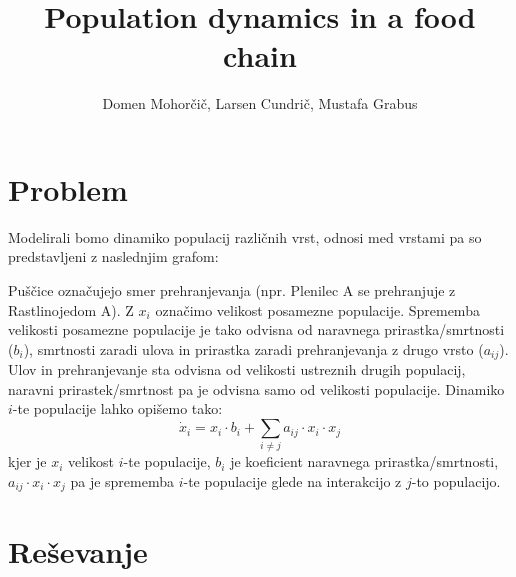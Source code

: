 \documentclass[a4paper, 12pt]{article}
\begin{document}
\title{Population dynamics in a food chain}
\author{Domen Mohorčič, Larsen Cundrič, Mustafa Grabus}
\maketitle

\section{Problem}
Modelirali bomo dinamiko populacij različnih vrst, odnosi med vrstami pa so predstavljeni
z naslednjim grafom: \\
\begin{center}
\end{center}
Puščice označujejo smer prehranjevanja (npr. Plenilec A se prehranjuje z Rastlinojedom A).
Z $ x_{i} $ označimo velikost posamezne populacije. Sprememba velikosti posamezne populacije
je tako odvisna od naravnega prirastka/smrtnosti ($ b_{i} $), smrtnosti zaradi ulova in prirastka zaradi
prehranjevanja z drugo vrsto ($ a_{ij} $). Ulov in prehranjevanje sta odvisna od velikosti ustreznih drugih populacij,
naravni prirastek/smrtnost pa je odvisna samo od velikosti populacije. Dinamiko $ i $-te
populacije lahko opišemo tako:
\begin{equation}
	\dot x_{i} = x_{i}\cdot b_{i} + \sum_{i \not = j} a_{ij}\cdot x_{i}\cdot x_{j}
\end{equation}
kjer je $ x_{i} $ velikost $ i $-te populacije, $ b_{i} $ je koeficient naravnega prirastka/smrtnosti,
$ a_{ij}\cdot x_{i}\cdot x_{j} $ pa je sprememba $ i $-te populacije glede na interakcijo z $ j $-to populacijo.

\section{Reševanje}
\end{document}
